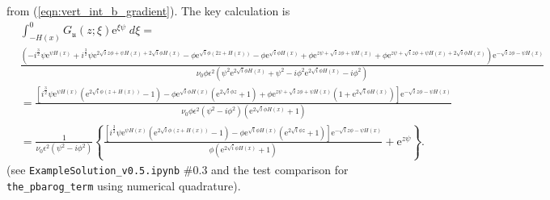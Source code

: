 \documentclass[10pt]{amsart}
\begin{document}
from (\ref{eqn:vert_int_b_gradient}).
The key calculation is
\begin{align}
&\int_{-H(x)}^{0} G_{ \mathfrak{u}} (z; \xi) 
 \mathrm{e}^{ \xi \psi} 
\; d \xi  = 
\nonumber \\
&\frac{\left(  - i^{\frac{3}{2}} \psi \mathrm{e}^{\psi  H(x)} + i^{\frac{3}{2}} \psi \mathrm{e}^{2 \sqrt{i} z \phi + \psi  H(x) + 2 \sqrt{i} \phi  H(x)} 
- \phi \mathrm{e}^{\sqrt{i} \phi \left( 2 z +  H(x) \right)} - \phi \mathrm{e}^{\sqrt{i} \phi  H(x)} 
+ \phi \mathrm{e}^{z \psi + \sqrt{i} z \phi + \psi  H(x)} + \phi \mathrm{e}^{z \psi + \sqrt{i} z \phi + \psi  H(x) + 2 \sqrt{i} \phi  H(x)} \right) 
\mathrm{e}^{ - \sqrt{i} z \phi - \psi  H(x)}}
{\nu_0 \phi \epsilon^{2} \left( \psi^{2} \mathrm{e}^{2 \sqrt{i} \phi  H(x)} + \psi^{2} - i \phi^{2} \mathrm{e}^{2 \sqrt{i} \phi  H(x)} - i \phi^{2} \right)}
\nonumber \\
&
= \frac{\left[  
i^{\frac{3}{2}} \psi \mathrm{e}^{\psi  H(x)} \left( \mathrm{e}^{2 \sqrt{i} \phi \left( z  +   H(x)\right)} - 1 \right) 
- \phi \mathrm{e}^{\sqrt{i} \phi  H(x)} \left( \mathrm{e}^{2 \sqrt{i} \phi  z } + 1 \right)
+ \phi \mathrm{e}^{z \psi + \sqrt{i} z \phi + \psi  H(x)} \left( 1 +  \mathrm{e}^{ 2 \sqrt{i} \phi  H(x)} \right) \right]
\mathrm{e}^{ - \sqrt{i} z \phi - \psi  H(x)}}
{\nu_0 \phi \epsilon^{2} 
\left( \psi^{2} - i \phi^{2} \right) \left(\mathrm{e}^{2 \sqrt{i} \phi  H(x)} + 1 \right)
}
\nonumber \\
&
= \frac{1}{\nu_0 \epsilon^{2} \left( \psi^{2} - i \phi^{2} \right)} 
\left\{
\frac{\left[  
i^{\frac{3}{2}} \psi \mathrm{e}^{\psi  H(x)} \left( \mathrm{e}^{2 \sqrt{i} \phi \left( z  +   H(x)\right)} - 1 \right) 
- \phi \mathrm{e}^{\sqrt{i} \phi  H(x)} \left( \mathrm{e}^{2 \sqrt{i} \phi  z } + 1 \right)
\right]
\mathrm{e}^{ - \sqrt{i} z \phi - \psi  H(x)}}
{ \phi  \left(\mathrm{e}^{2 \sqrt{i} \phi  H(x)} + 1 \right)
}
+ 
\mathrm{e}^{z \psi } 
\right\} .
\end{align}
(see \texttt{ExampleSolution\_v0.5.ipynb} \#0.3 and the test comparison for \texttt{the\_pbarog\_term} using numerical quadrature).
 
\end{document}
